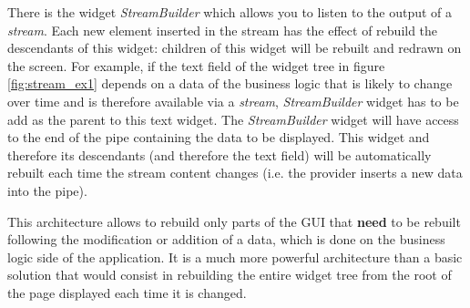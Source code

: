 There is the widget \textit{StreamBuilder} which allows you to listen to the output of a \textit{stream}. Each new element inserted in the stream has the effect of rebuild the descendants of this widget: children of this widget will be rebuilt and redrawn on the screen. For example, if the text field of the widget tree in figure \ref{fig:stream_ex1} depends on a data of the business logic that is likely to change over time and is therefore available via a \textit{stream},  \textit{StreamBuilder} widget has to be add as the parent to this text widget. The \textit{StreamBuilder} widget will have access to the end of the pipe containing the data to be displayed. This widget and therefore its descendants (and therefore the text field) will be automatically rebuilt each time the stream content changes (i.e. the provider inserts a new data into the pipe).

This architecture allows to rebuild only parts of the GUI that \textbf{need} to be rebuilt following the modification or addition of a data, which is done on the business logic side of the application. It is a much more powerful architecture than a basic solution that would consist in rebuilding the entire widget tree from the root of the page displayed each time it is changed.

